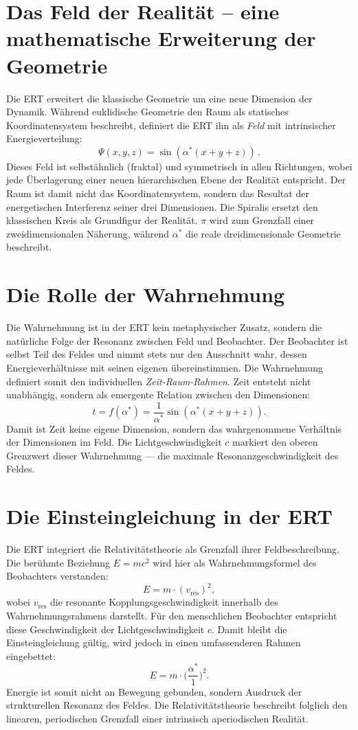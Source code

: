 \section{Das Feld der Realität – eine mathematische Erweiterung der Geometrie}
Die ERT erweitert die klassische Geometrie um eine neue Dimension der Dynamik.  
Während euklidische Geometrie den Raum als statisches Koordinatensystem beschreibt, definiert die ERT ihn als \emph{Feld} mit intrinsischer Energieverteilung:
\[
\Psi(x,y,z) = \sin(\alpha^*(x+y+z)) \, .
\]
Dieses Feld ist selbstähnlich (fraktal) und symmetrisch in allen Richtungen, wobei jede Überlagerung einer neuen hierarchischen Ebene der Realität entspricht.  
Der Raum ist damit nicht das Koordinatensystem, sondern das Resultat der energetischen Interferenz seiner drei Dimensionen.  
Die Spiralis ersetzt den klassischen Kreis als Grundfigur der Realität.  
\(\pi\) wird zum Grenzfall einer zweidimensionalen Näherung, während \(\alpha^*\) die reale dreidimensionale Geometrie beschreibt.

\section{Die Rolle der Wahrnehmung}
Die Wahrnehmung ist in der ERT kein metaphysischer Zusatz, sondern die natürliche Folge der Resonanz zwischen Feld und Beobachter.  
Der Beobachter ist selbst Teil des Feldes und nimmt stets nur den Ausschnitt wahr, dessen Energieverhältnisse mit seinen eigenen übereinstimmen.  
Die Wahrnehmung definiert somit den individuellen \textit{Zeit-Raum-Rahmen}.  
Zeit entsteht nicht unabhängig, sondern als emergente Relation zwischen den Dimensionen:  
\[
t = f(\alpha^*) = \frac{1}{\alpha^*} \sin(\alpha^*(x+y+z)) .
\]
Damit ist Zeit keine eigene Dimension, sondern das wahrgenommene Verhältnis der Dimensionen im Feld.  
Die Lichtgeschwindigkeit \(c\) markiert den oberen Grenzwert dieser Wahrnehmung — die maximale Resonanzgeschwindigkeit des Feldes.

\section{Die Einsteingleichung in der ERT}
Die ERT integriert die Relativitätstheorie als Grenzfall ihrer Feldbeschreibung.  
Die berühmte Beziehung \(E = mc^2\) wird hier als Wahrnehmungsformel des Beobachters verstanden:
\[
E = m \cdot (v_\text{res})^2 ,
\]
wobei \(v_\text{res}\) die resonante Kopplungsgeschwindigkeit innerhalb des Wahrnehmungsrahmens darstellt.  
Für den menschlichen Beobachter entspricht diese Geschwindigkeit der Lichtgeschwindigkeit \(c\).  
Damit bleibt die Einsteingleichung gültig, wird jedoch in einen umfassenderen Rahmen eingebettet:
\[
E = m \cdot \biggl(\frac{\alpha^*}{1}\biggr)^2 .
\]
Energie ist somit nicht an Bewegung gebunden, sondern Ausdruck der strukturellen Resonanz des Feldes.  
Die Relativitätstheorie beschreibt folglich den linearen, periodischen Grenzfall einer intrinsisch aperiodischen Realität.

